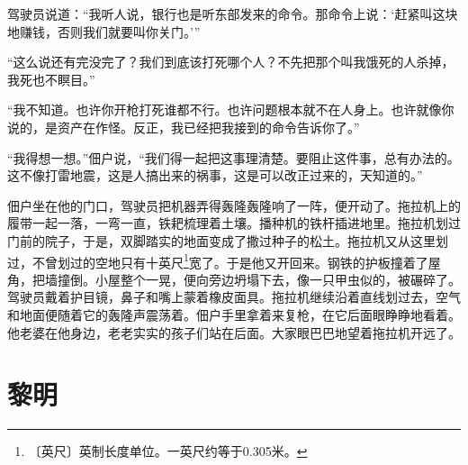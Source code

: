 \documentclass[12pt,UTF-8,openany]{ctexbook}
\begin{document}
\begin{large}
    驾驶员说道：“我听人说，银行也是听东部发来的命令。那命令上说：‘赶紧叫这块地赚钱，否则我们就要叫你关门。’”
    
    “这么说还有完没完了？我们到底该打死哪个人？不先把那个叫我饿死的人杀掉，我死也不瞑目。”
    
    “我不知道。也许你开枪打死谁都不行。也许问题根本就不在人身上。也许就像你说的，是资产在作怪。反正，我已经把我接到的命令告诉你了。”
    
    “我得想一想。”佃户说，“我们得一起把这事理清楚。要阻止这件事，总有办法的。这不像打雷地震，这是人搞出来的祸事，这是可以改正过来的，天知道的。”
    
    佃户坐在他的门口，驾驶员把机器弄得轰隆轰隆响了一阵，便开动了。拖拉机上的履带一起一落，一弯一直，铁耙梳理着土壤。播种机的铁杆插进地里。拖拉机划过门前的院子，于是，双脚踏实的地面变成了撒过种子的松土。拖拉机又从这里划过，不曾划过的空地只有十英尺\footnote{〔英尺〕英制长度单位。一英尺约等于0.305米。}宽了。于是他又开回来。钢铁的护板撞着了屋角，把墙撞倒。小屋整个一晃，便向旁边坍塌下去，像一只甲虫似的，被碾碎了。驾驶员戴着护目镜，鼻子和嘴上蒙着橡皮面具。拖拉机继续沿着直线划过去，空气和地面便随着它的轰隆声震荡着。佃户手里拿着来复枪，在它后面眼睁睁地看着。他老婆在他身边，老老实实的孩子们站在后面。大家眼巴巴地望着拖拉机开远了。
    
\end{large}



\chapter{黎明}
\end{document}
